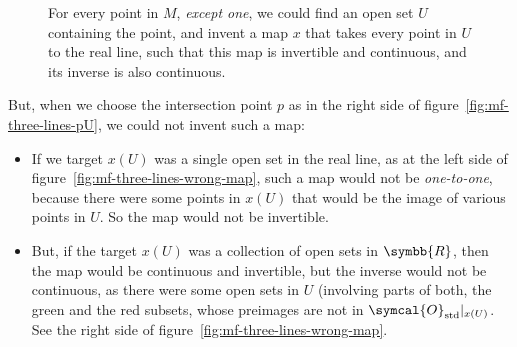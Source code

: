 \begin{figure}[ht]
  \caption{For every point in $M$, \emph{except one}, we could find an open set $U$ containing the
    point, and invent a map $x$ that takes every point in $U$ to the real line, such that this
    map is invertible and continuous, and its inverse is also continuous.}
  \label{fig:mf-three-lines-invertible-map}
\end{figure}

But, when we choose the intersection point $p$ as in the right side of
figure~\ref{fig:mf-three-lines-pU}, we could not invent such a map:

\begin{itemize}
\item
  If we target $x(U)$ was a single open set in the real line, as at the left side of
  figure~\ref{fig:mf-three-lines-wrong-map}, such a map would not be \emph{one-to-one},
  because there were some points in $x(U)$ that would be the image of various points in $U$.
  So the map would not be invertible.
\item
  But, if the target $x(U)$ was a collection of open sets in $\symbb{R}$, then the map would
  be continuous and invertible, but the inverse would not be continuous, as there were some
  open sets in $U$ (involving parts of both, the green and the red subsets, whose preimages are not
  in $\symcal{O}_{\text{std}}|_{x(U)}$. See the right side of
  figure~\ref{fig:mf-three-lines-wrong-map}.
\end{itemize}

